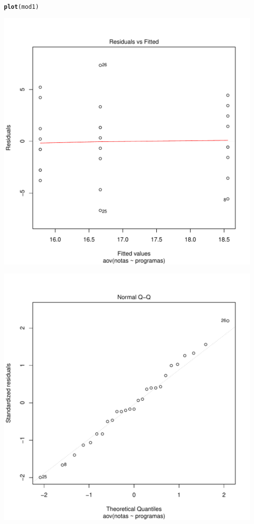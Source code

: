 \documentclass[12pt,letterpaper]{article}\usepackage[]{graphicx}\usepackage[]{color}
\makeatletter
\def\maxwidth{ %
  \ifdim\Gin@nat@width>\linewidth
    \linewidth
  \else
    \Gin@nat@width
  \fi
}
\newcommand{\hlstd}[1]{\textcolor[rgb]{0.345,0.345,0.345}{#1}}%
\newcommand{\hlkwd}[1]{\textcolor[rgb]{0.737,0.353,0.396}{\textbf{#1}}}%
\newenvironment{kframe}{%
 \def\at@end@of@kframe{}%
 \ifinner\ifhmode%
  \def\at@end@of@kframe{\end{minipage}}%
  \begin{minipage}{\columnwidth}%
 \fi\fi%
 \def\FrameCommand##1{\hskip\@totalleftmargin \hskip-\fboxsep
 \colorbox{shadecolor}{##1}\hskip-\fboxsep
     \hskip-\linewidth \hskip-\@totalleftmargin \hskip\columnwidth}%
 \MakeFramed {\advance\hsize-\width
   \@totalleftmargin\z@ \linewidth\hsize
   \@setminipage}}%
 {\par\unskip\endMakeFramed%
 \at@end@of@kframe}
\newenvironment{knitrout}{}{} %
\makeatother
\begin{document}
\begin{itemize}
\begin{knitrout}
\begin{kframe}
\begin{alltt}
\hlkwd{plot}\hlstd{(mod1)}
\end{alltt}
\end{kframe}
\includegraphics[width=\maxwidth]{figure/unnamed-chunk-2-1} 

\includegraphics[width=\maxwidth]{figure/unnamed-chunk-2-2} 


\end{knitrout}
\end{itemize}
\end{document}
